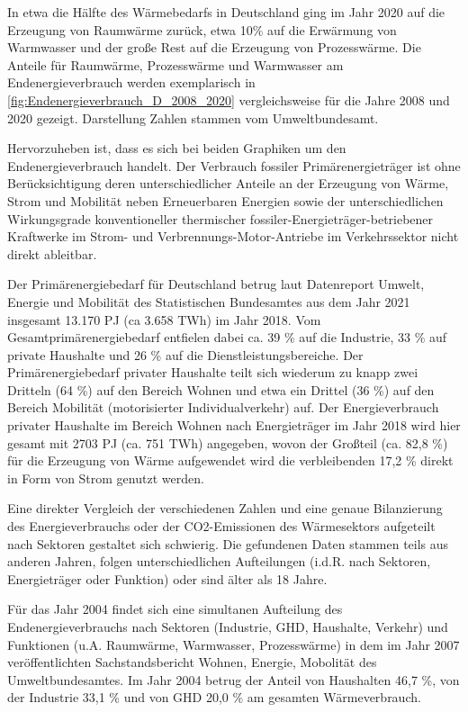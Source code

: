 				In etwa die Hälfte des Wärmebedarfs in Deutschland ging im Jahr 2020 auf die Erzeugung von Raumwärme zurück, etwa 10\% auf die Erwärmung von Warmwasser und der große Rest auf die Erzeugung von Prozesswärme. Die Anteile für Raumwärme, Prozesswärme und Warmwasser am Endenergieverbrauch werden exemplarisch in \autoref{fig:Endenergieverbrauch_D_2008_2020} vergleichsweise für die Jahre 2008 und 2020 gezeigt. Darstellung Zahlen stammen vom Umweltbundesamt. \cite{Umweltbundesamt_Energieverbrauch_Wärme}  

				Hervorzuheben ist, dass es sich bei beiden Graphiken um den Endenergieverbrauch handelt. Der Verbrauch fossiler Primärenergieträger ist ohne Berücksichtigung deren unterschiedlicher Anteile an der Erzeugung von Wärme, Strom und Mobilität neben Erneuerbaren Energien sowie der unterschiedlichen Wirkungsgrade konventioneller thermischer fossiler-Energieträger-betriebener Kraftwerke im Strom- und Verbrennungs-Motor-Antriebe im Verkehrssektor nicht direkt ableitbar. 
				
				Der Primärenergiebedarf für Deutschland betrug laut Datenreport Umwelt, Energie und Mobilität des Statistischen Bundesamtes aus dem Jahr 2021 insgesamt 13.170 PJ (ca 3.658 TWh) im Jahr 2018. Vom Gesamtprimärenergiebedarf entfielen dabei ca. 39 \% auf die Industrie, 33 \% auf private Haushalte und 26 \% auf die Dienstleistungsbereiche. Der Primärenergiebedarf privater Haushalte teilt sich wiederum zu knapp zwei Dritteln (64 \%) auf den Bereich Wohnen und etwa ein Drittel (36 \%) auf den Bereich Mobilität (motorisierter Individualverkehr) auf. Der Energieverbrauch privater Haushalte im Bereich Wohnen nach Energieträger im Jahr 2018 wird hier gesamt mit 2703 PJ (ca. 751 TWh) angegeben, wovon der Großteil (ca. 82,8 \%) für die Erzeugung von Wärme aufgewendet wird die verbleibenden 17,2 \% direkt in Form von Strom genutzt werden. \cite{Destatis_Datenreport_2021_Umwelt_Energie_Mobilitaet}
				
				Eine direkter Vergleich der verschiedenen Zahlen und eine genaue Bilanzierung des Energieverbrauchs oder der CO2-Emissionen des Wärmesektors aufgeteilt nach Sektoren gestaltet sich schwierig. Die gefundenen Daten stammen teils aus anderen Jahren, folgen unterschiedlichen Aufteilungen (i.d.R. nach Sektoren, Energieträger oder Funktion) oder sind älter als 18 Jahre.  
				
				Für das Jahr 2004 findet sich eine simultanen Aufteilung des Endenergieverbrauchs nach Sektoren (Industrie, GHD, Haushalte, Verkehr) und Funktionen (u.A. Raumwärme, Warmwasser, Prozesswärme) in dem im Jahr 2007 veröffentlichten Sachstandsbericht Wohnen, Energie, Mobolität des Umweltbundesamtes. Im Jahr 2004 betrug der Anteil von Haushalten 46,7 \%, von der Industrie 33,1 \% und von GHD 20,0 \% am gesamten Wärmeverbrauch. \cite[S.~27]{UBA_2007_Nachhaltige_Waermeversorgung}
				
